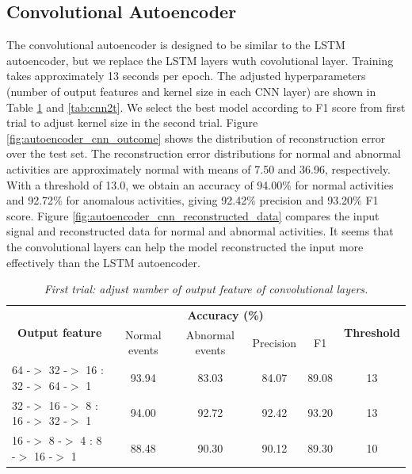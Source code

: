 \subsection{Convolutional Autoencoder}
The convolutional autoencoder is designed to be similar to the LSTM autoencoder, but we replace the LSTM layers wuth covolutional layer. Training takes approximately 13 seconds per epoch. The adjusted hyperparameters (number of output features and kernel size in each CNN layer) are shown in Table \ref{tab:cnn1t} and \ref{tab:cnn2t}. We select the best model according to F1 score from first trial to adjust kernel size in the second trial. Figure \ref{fig:autoencoder_cnn_outcome} shows the  distribution of reconstruction error over the test set. The reconstruction error distributions for normal and abnormal activities are approximately normal with means of 7.50 and 36.96, respectively. With a threshold of 13.0, we obtain an accuracy of 94.00$\%$ for normal activities and 92.72$\%$ for anomalous activities, giving 92.42$\%$ precision and 93.20$\%$ F1 score. Figure \ref{fig:autoencoder_cnn_reconstructed_data} compares the input signal and reconstructed data for normal and abnormal activities. It seems that the convolutional layers can help the model reconstructed the input more effectively than the LSTM autoencoder.

\begin{table}[H]
  \begin{center}
    \caption[First trial: adjust number of output feature of convolutional layers.]{\emph{First trial: adjust number of output feature of convolutional layers.} \\ \hspace{\textwidth}}\label{tab:cnn1t}
    \begin{tabular}{c c c c c c c}
      \hline
      \multicolumn{2}{c}{\multirow{2}{*}{\textbf{Output feature}}} & \multicolumn{4}{c}{\textbf{Accuracy (\%)}} & \multirow{2}{*}{\textbf{Threshold}}                                      \\
      \cline{3-6}
                                                                   &                                            & Normal events                       & Abnormal events & Precision & F1 & \\
      \hline
      \multicolumn{2}{l}{64 -$>$ 32 -$>$ 16 : 32 -$>$ 64 -$>$ 1}   & 93.94                                      & 83.03                               & 84.07           & 89.08     & 13   \\
      \multicolumn{2}{l}{32 -$>$ 16 -$>$  8 : 16 -$>$ 32 -$>$ 1}   & 94.00                                      & 92.72                               & 92.42           & 93.20     & 13   \\
      \multicolumn{2}{l}{16 -$>$  8 -$>$  4 :  8 -$>$ 16 -$>$ 1}   & 88.48                                      & 90.30                               & 90.12           & 89.30     & 10   \\
      \hline
    \end{tabular}
  \end{center}
\end{table}

